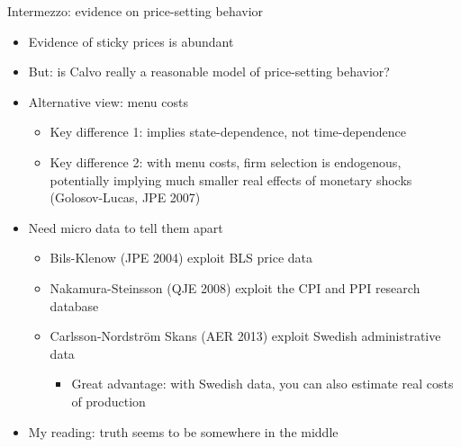 \documentclass[9pt,xcolor={dvipsnames}]{beamer}
\newcommand{\bit}{\begin{itemize}}
\newcommand{\eit}{\end{itemize}}
\begin{document}
\begin{frame}{Intermezzo: evidence on price-setting behavior}

\bit
\setlength\itemsep{1.5em}

\item Evidence of sticky prices is abundant

\item But: is Calvo really a reasonable model of price-setting behavior?

\item Alternative view: menu costs
\bit
	\item Key difference 1: implies state-dependence, not time-dependence
	
	\item Key difference 2: with menu costs, firm selection is endogenous, potentially implying much smaller real effects of monetary shocks (Golosov-Lucas, JPE 2007)
\eit

\item Need micro data to tell them apart
\bit
\setlength\itemsep{0.5em}
\item Bils-Klenow (JPE 2004) exploit BLS price data

\item Nakamura-Steinsson (QJE 2008) exploit the CPI and PPI research database

\item Carlsson-Nordstr{\"o}m Skans (AER 2013) exploit Swedish administrative data
\bit
	\item Great advantage: with Swedish data, you can also estimate real costs of production
\eit

\eit

\item My reading: truth seems to be somewhere in the middle


\eit

\end{frame}
\end{document}
